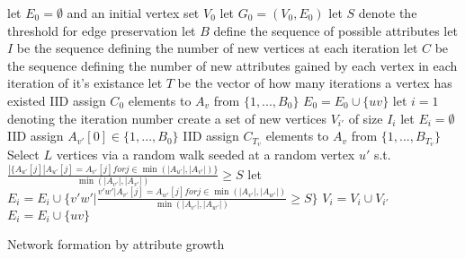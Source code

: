\documentclass{article}
\begin{document}
\begin{algorithm}[H]
\SetAlgoLined
 let $E_0 = \emptyset$ and an initial vertex set $V_0$\;
 let $G_0 = (V_0, E_0)$\;
 let $S$ denote the threshold for edge preservation\;
 let $B$ define the sequence of possible attributes\;
 let $I$ be the sequence defining the number of new vertices at each iteration\;
 let $C$ be the sequence defining the number of new attributes gained by each vertex in each iteration of it's existance\; 
 let $T$ be the vector of how many iterations a vertex has existed\;
  {
 	IID assign $C_0$ elements to $A_v$ from $\{1, ..., B_0\}$\;
 }
  {
 	 {
 		$E_0 = E_0 \cup \{uv\}$\;
 	}
 }
 let $i = 1$ denoting the iteration number\;
  {
 	create a set of new vertices $V_{i'}$ of size $I_i$\;
 	let $E_i = \emptyset$
 	 {
 		IID assign $A_{v'}[0] \in \{1, ..., B_0\}$\;
 	}
 	 {
 		IID assign $C_{T_v}$ elements to $A_v$ from $\{1, ..., B_{T_v}\}$
 	}
 	 {
 		Select $L$ vertices via a random walk seeded at a random vertex $u'$ s.t. $\frac{|\{A_{u'}[j] | A_{u'}[j] = A_{v'}[j] for j \in \min(|A_{u'}|, |A_{v'}|)\}}{\min(|A_{v'}|,|A_{v'}|)} \geq S$\;
 		let $E_i = E_i \cup \{ v'w' | \frac{ v'w' | A_{v'}[j] = A_{w'}[j] for j \in \min(|A_{v'}|, |A_{w'}|)}{\min(|A_{v'}|,|A_{w'}|)} \geq S \}$\;
 	}
 	$V_i = V_i \cup V_{i'}$\;
 	 {
 		 {
 			$E_i = E_i \cup \{uv\}$\;
 		}
 	}
 }
 \caption{Network formation by attribute growth}
\end{algorithm}
\end{document}
